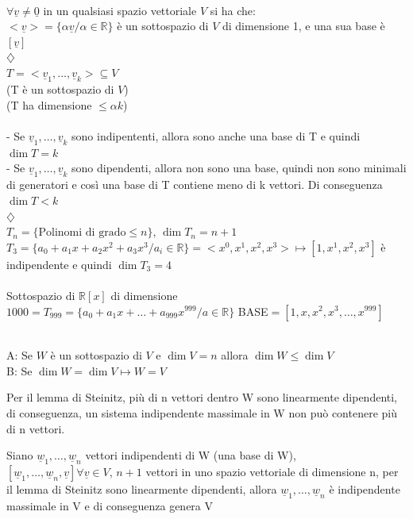 \begin{proposizione}
	\phantom{text}\\
	$\forall\underline{v}\neq\underline{0}$ in un qualsiasi spazio  vettoriale $V$ si ha che:\\
	$<\underline{v}>=\{\alpha\underline{v}/\alpha\in\mathbb{R}\}$ è un sottospazio di $V$ di dimensione 1, e una sua base è $[\underline{v}]$\\$\diamondsuit$\\
	$T=<\underline{v}_1,\dots,\underline{v}_k>\subseteq V$\\
	(T è un sottospazio di $V$)\\
	(T ha dimensione $\leqslant\alpha k$)\\\\
	- Se $\underline{v}_1,\dots,\underline{v}_k$ sono indipententi, allora sono anche una base di T e quindi $\dim T=k$\\
	- Se $\underline{v}_1,\dots,\underline{v}_k$ sono dipendenti, allora non sono una base, quindi non sono minimali di generatori e così una base di T contiene meno di k vettori. Di conseguenza $\dim T<k$\\$\diamondsuit$\\
	$T_n=\{\text{Polinomi di grado}\leqslant n\}$, $\dim T_n=n+1$\\
	$T_3=\{a_0+a_1 x+a_2 x^2+a_3 x^3/a_i\in\mathbb{R}\}=<x^0,x^1,x^2,x^3>\mapsto[1,x^1,x^2,x^3]$ è indipendente e quindi $\dim T_3=4$\\\\
	Sottospazio di $\mathbb{R}[x]$ di dimensione $1000=T_{999}=\{a_0+a_1 x+\dots+a_{999}x^{999}/a\in\mathbb{R}\}$ BASE$=[1,x,x^2,x^3,\dots,x^{999}]$
\end{proposizione}

\begin{proposizione}
	\phantom{text}\\
	A: Se $W$ è un sottospazio di $V$ e $\dim V=n$ allora $\dim W\leqslant\dim V$\\
	B: Se $\dim W=\dim V\mapsto W=V$
	\begin{dimostrazione}[A]
		Per il lemma di Steinitz, più di n vettori dentro W sono linearmente dipendenti, di conseguenza, un sistema indipendente massimale in W non può contenere più di n vettori.
	\end{dimostrazione}
	\begin{dimostrazione}[B]
		Siano $\underline{w}_1,\dots,\underline{w}_n$ vettori indipendenti di W (una base di W), \\$[\underline{w}_1,\dots,\underline{w}_n,\underline{v}]\forall\underline{v}\in V$, $n+1$ vettori in uno spazio vettoriale di dimensione n, per il lemma di Steinitz sono linearmente dipendenti, allora $\underline{w}_1,\dots,\underline{w}_n$ è indipendente massimale in V e di conseguenza genera V
	\end{dimostrazione}
\end{proposizione}

